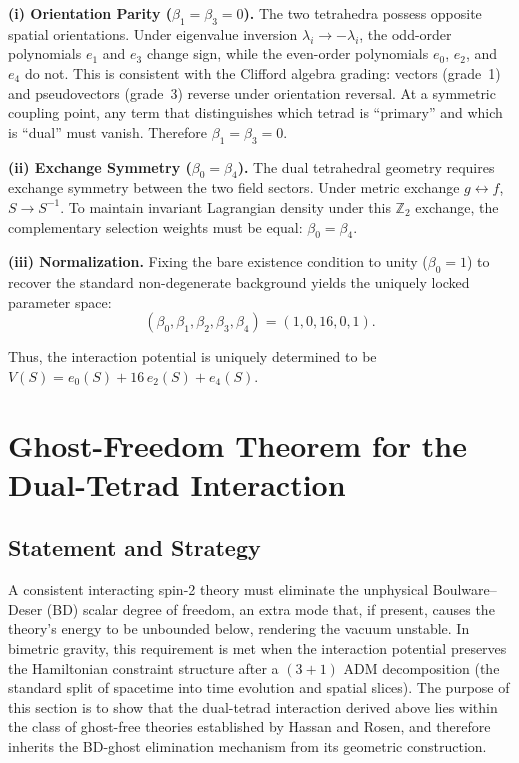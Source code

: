\documentclass[twocolumn]{iopjournal}
\begin{document}
\textbf{(i) Orientation Parity ($\beta_1 = \beta_3 = 0$).} The two tetrahedra possess opposite spatial orientations. Under eigenvalue inversion $\lambda_i \to -\lambda_i$, the odd-order polynomials $e_1$ and $e_3$ change sign, while the even-order polynomials $e_0$, $e_2$, and $e_4$ do not. This is consistent with the Clifford algebra grading: vectors (grade~1) and pseudovectors (grade~3) reverse under orientation reversal. At a symmetric coupling point, any term that distinguishes which tetrad is ``primary'' and which is ``dual'' must vanish. Therefore $\beta_1 = \beta_3 = 0$.

\textbf{(ii) Exchange Symmetry ($\beta_0 = \beta_4$).} The dual tetrahedral geometry requires exchange symmetry between the two field sectors. Under metric exchange $g \leftrightarrow f$, $S \to S^{-1}$. To maintain invariant Lagrangian density under this $\mathbb{Z}_2$ exchange, the complementary selection weights must be equal: $\beta_0 = \beta_4$.

\textbf{(iii) Normalization.} Fixing the bare existence condition to unity ($\beta_0 = 1$) to recover the standard non-degenerate background yields the uniquely locked parameter space:
\begin{equation}
(\beta_0,\beta_1,\beta_2,\beta_3,\beta_4) = (1,0,16,0,1).
\end{equation}

Thus, the interaction potential is uniquely determined to be $V(S) = e_0(S) + 16\, e_2(S) + e_4(S)$.


\section*{Ghost-Freedom Theorem for the Dual-Tetrad Interaction}

\subsection*{Statement and Strategy}
A consistent interacting spin-2 theory must eliminate the unphysical Boulware--Deser (BD) scalar degree of freedom, an extra mode that, if present, causes the theory's energy to be unbounded below, rendering the vacuum unstable. In bimetric gravity, this requirement is met when the interaction potential preserves the Hamiltonian constraint structure after a $(3+1)$ ADM decomposition (the standard split of spacetime into time evolution and spatial slices). The purpose of this section is to show that the dual-tetrad interaction derived above lies within the class of ghost-free theories established by Hassan and Rosen, and therefore inherits the BD-ghost elimination mechanism from its geometric construction.
\end{document}
